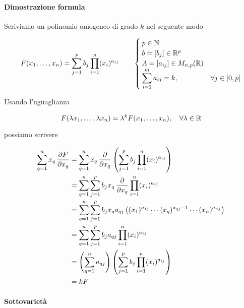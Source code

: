 {
\paragraph{Dimostrazione formula}

Scriviamo un polinomio omogeneo di grado $ k $ nel seguente modo

\begin{equation}
	F(x_{1},\dots,x_{n}) = \sum_{j=1}^{p} b_{j} \prod_{i=1}^{n} (x_{i})^{a_{ij}} %
	\qquad %
	\begin{cases}
		p \in \N \\
		b = [b_{j}] \in \R^{p} \\
		A = [a_{ij}] \in M_{n,p}(\R) \\
		\displaystyle\sum_{i=1}^{m} a_{ij} = k, & \forall j \in [0,p]
	\end{cases}
\end{equation}

Usando l'uguaglianza

\begin{equation}
	F(\lambda x_{1},\dots,\lambda x_{n}) = \lambda^{k} F(x_{1},\dots,x_{n}) %
	\qcomma \forall \lambda \in \R
\end{equation}

possiamo scrivere

\begin{align}
	\begin{split}
		\sum_{q=1}^{n} x_{q} \, \pdv{F}{x_{q}} &= \sum_{q=1}^{n} x_{q} \, \pdv{x_{q}} \left( \sum_{j=1}^{p} b_{j} \prod_{i=1}^{n} (x_{i})^{a_{ij}} \right) \\
		&= \sum_{q=1}^{n} \sum_{j=1}^{p} b_{j} x_{q} \, \pdv{x_{q}} \prod_{i=1}^{n} (x_{i})^{a_{ij}} \\
		&= \sum_{q=1}^{n} \sum_{j=1}^{p} b_{j} x_{q} a_{qj} \left( (x_{1})^{a_{1j}} \cdots (x_{q})^{a_{qj} - 1} \cdots (x_{n})^{a_{nj}} \right) \\
		&= \sum_{q=1}^{n} \sum_{j=1}^{p} b_{j} a_{qj} \prod_{i=1}^{n} (x_{i})^{a_{ij}} \\
		&= \left( \sum_{q=1}^{n} a_{qj} \right) \left( \sum_{j=1}^{p} b_{j} \prod_{i=1}^{n} (x_{i})^{a_{ij}} \right) \\
		&= k F
	\end{split}
\end{align}

\paragraph{Sottovarietà}

}
